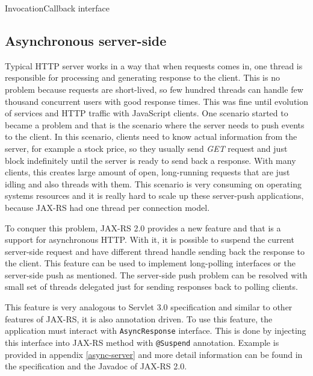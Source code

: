 \documentclass[12pt,final,oneside]{fithesis2}
\begin{document}
\begin{listing}[ht]
	\inputminted[]{java}{sources/callback.java}
	\caption{InvocationCallback interface}
	\label{callback}
\end{listing}

\subsection*{Asynchronous server-side}
Typical HTTP server works in a way that when requests comes in, one thread is responsible for processing and generating response to the client. This is no problem because requests are short-lived, so few hundred threads can handle few thousand concurrent users with good response times. This was fine until evolution of services and HTTP traffic with JavaScript clients. One scenario started to became a problem and that is the scenario where the server needs to push events to the client. In this scenario, clients need to know actual information from the server, for example a stock price, so they usually send \textit{GET} request and just block indefinitely until the server is ready to send back a response. With many clients, this creates large amount of open, long-running requests that are just idling and also threads with them. This scenario is very consuming on operating systems resources and it is really hard to scale up these server-push applications, because JAX-RS had one thread per connection model.\cite{resteasy-book}

To conquer this problem, JAX-RS 2.0 provides a new feature and that is a support for asynchronous HTTP. With it, it is possible to suspend the current server-side request and have different thread handle sending back the response to the client. This feature can be used to implement long-polling interfaces or the server-side push as mentioned. The server-side push problem can be resolved with small set of threads delegated just for sending  responses back to polling clients.

This feature is very analogous to Servlet 3.0 specification and similar to other features of JAX-RS, it is also annotation driven. To use this feature, the application must interact with \texttt{AsyncResponse} interface. This is done by injecting this interface into JAX-RS method with \texttt{@Suspend} annotation.\cite{resteasy-book}\cite{jax-rs-2.0} Example is provided in appendix \ref{async-server} and more detail information can be found in the specification and the Javadoc of JAX-RS 2.0.
\end{document}
